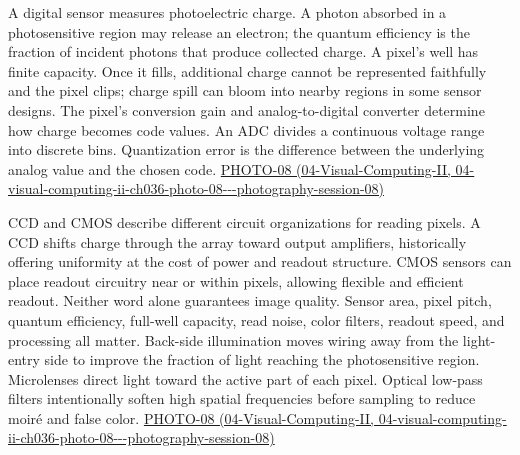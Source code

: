 A digital sensor measures photoelectric charge. A photon absorbed in a photosensitive region may release an electron; the quantum efficiency is the fraction of incident photons that produce collected charge. A pixel's well has finite capacity. Once it fills, additional charge cannot be represented faithfully and the pixel clips; charge spill can bloom into nearby regions in some sensor designs. The pixel's conversion gain and analog-to-digital converter determine how charge becomes code values. An ADC divides a continuous voltage range into discrete bins. Quantization error is the difference between the underlying analog value and the chosen code. \href{../04-Visual-Computing-II/main.pdf\#nameddest=04-visual-computing-ii-ch036-photo-08---photography-session-08}{PHOTO-08 (04-Visual-Computing-II, 04-visual-computing-ii-ch036-photo-08-\/-\/-photography-session-08)}

CCD and CMOS describe different circuit organizations for reading pixels. A CCD shifts charge through the array toward output amplifiers, historically offering uniformity at the cost of power and readout structure. CMOS sensors can place readout circuitry near or within pixels, allowing flexible and efficient readout. Neither word alone guarantees image quality. Sensor area, pixel pitch, quantum efficiency, full-well capacity, read noise, color filters, readout speed, and processing all matter. Back-side illumination moves wiring away from the light-entry side to improve the fraction of light reaching the photosensitive region. Microlenses direct light toward the active part of each pixel. Optical low-pass filters intentionally soften high spatial frequencies before sampling to reduce moiré and false color. \href{../04-Visual-Computing-II/main.pdf\#nameddest=04-visual-computing-ii-ch036-photo-08---photography-session-08}{PHOTO-08 (04-Visual-Computing-II, 04-visual-computing-ii-ch036-photo-08-\/-\/-photography-session-08)}

